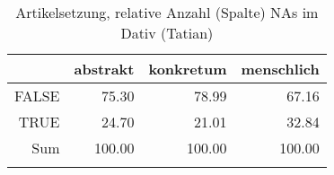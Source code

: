 \begin{table}[ht]
\centering
\begin{tabular}{rrrr}
  \lsptoprule
 & abstrakt & konkretum & menschlich \\ 
  \midrule
FALSE & 75.30 & 78.99 & 67.16 \\ 
  TRUE & 24.70 & 21.01 & 32.84 \\ 
  Sum & 100.00 & 100.00 & 100.00 \\ 
   \lspbottomrule
\end{tabular}
\caption{Artikelsetzung, relative Anzahl (Spalte) NAs im Dativ (Tatian)} 
\end{table}
